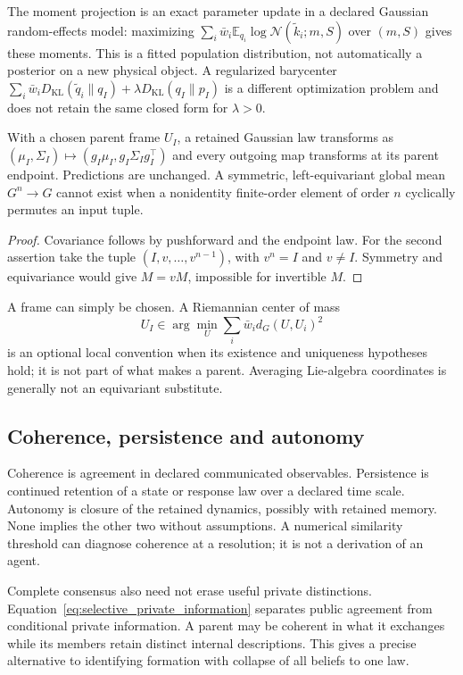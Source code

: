 \label{sec:meta_agent_variational}
The moment projection is an exact parameter update in a declared Gaussian random-effects model: maximizing $\sum_i\bar w_i\mathbb E_{q_i}\log\mathcal N(\tilde k_i;m,S)$ over $(m,S)$ gives these moments. This is a fitted population distribution, not automatically a posterior on a new physical object. A regularized barycenter
$\sum_i\bar w_iD_{\mathrm{KL}}(\tilde q_i\|q_I)+\lambda D_{\mathrm{KL}}(q_I\|p_I)$
is a different optimization problem and does not retain the same closed form for $\lambda>0$.

\begin{proposition}\label{prop:parent_frame_gauge}
With a chosen parent frame $U_I$, a retained Gaussian law transforms as
$(\mu_I,\Sigma_I)\mapsto(g_I\mu_I,g_I\Sigma_Ig_I^\top)$ and every outgoing map transforms at its parent endpoint. Predictions are unchanged. A symmetric, left-equivariant global mean $G^n\to G$ cannot exist when a nonidentity finite-order element of order $n$ cyclically permutes an input tuple.
\end{proposition}
\begin{proof}
Covariance follows by pushforward and the endpoint law. For the second assertion take the tuple $(I,v,\ldots,v^{n-1})$, with $v^n=I$ and $v\ne I$. Symmetry and equivariance would give $M=vM$, impossible for invertible $M$.
\end{proof}
A frame can simply be chosen. A Riemannian center of mass
\begin{equation}
U_I\in\arg\min_U\sum_i\bar w_i d_G(U,U_i)^2
\label{eq:meta_agent_frame_barycenter}
\end{equation}
is an optional local convention when its existence and uniqueness hypotheses hold; it is not part of what makes a parent. Averaging Lie-algebra coordinates is generally not an equivariant substitute.

\subsection{Coherence, persistence and autonomy}\label{sec:meta_agent_threshold}
Coherence is agreement in declared communicated observables. Persistence is continued retention of a state or response law over a declared time scale. Autonomy is closure of the retained dynamics, possibly with retained memory. None implies the other two without assumptions. A numerical similarity threshold can diagnose coherence at a resolution; it is not a derivation of an agent.

\label{sec:epistemic_collapse}
Complete consensus also need not erase useful private distinctions. Equation~\eqref{eq:selective_private_information} separates public agreement from conditional private information. A parent may be coherent in what it exchanges while its members retain distinct internal descriptions. This gives a precise alternative to identifying formation with collapse of all beliefs to one law.

